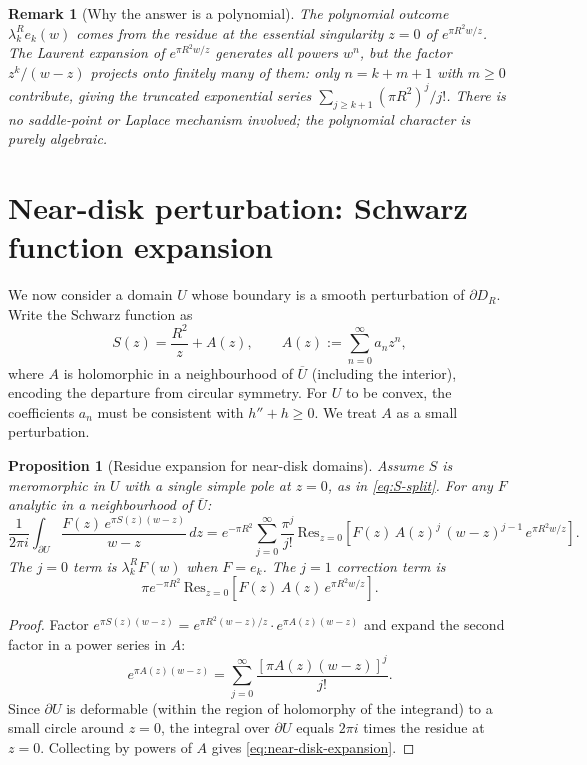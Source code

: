 \documentclass[a4paper,11pt,reqno]{amsart}
\newtheorem{proposition}{Proposition}[section]
\newtheorem{remark}{Remark}[section]
\begin{document}
\begin{remark}[Why the answer is a polynomial]
The polynomial outcome $\lambda_k^R e_k(w)$ comes from the residue at the
\emph{essential singularity} $z=0$ of $e^{\pi R^2 w/z}$. The Laurent expansion
of $e^{\pi R^2w/z}$ generates all powers $w^n$, but the factor $z^k/(w-z)$
projects onto finitely many of them: only $n=k+m+1$ with $m\ge0$ contribute,
giving the truncated exponential series $\sum_{j\ge k+1}(\pi R^2)^j/j!$. There
is no saddle-point or Laplace mechanism involved; the polynomial character is
purely algebraic.
\end{remark}

\section{Near-disk perturbation: Schwarz function expansion}
\label{sec:near-disk}

We now consider a domain $U$ whose boundary is a smooth perturbation of
$\partial D_R$. Write the Schwarz function as
\begin{equation}\label{eq:S-split}
S(z)=\frac{R^2}{z}+A(z),\qquad A(z):=\sum_{n=0}^\infty a_n z^n,
\end{equation}
where $A$ is holomorphic in a neighbourhood of $\overline{U}$ (including the
interior), encoding the departure from circular symmetry.
For $U$ to be convex, the coefficients $a_n$ must be consistent with
$h''+h\ge 0$. We treat $A$ as a small perturbation.

\begin{proposition}[Residue expansion for near-disk domains]
\label{prop:near-disk-residue}
Assume $S$ is meromorphic in $U$ with a single simple pole at $z=0$, as in
\eqref{eq:S-split}. For any $F$ analytic in a neighbourhood of $\overline{U}$:
\begin{equation}\label{eq:near-disk-expansion}
\frac{1}{2\pi i}\int_{\partial U}\frac{F(z)\,e^{\pi S(z)(w-z)}}{w-z}\,dz
=e^{-\pi R^2}\!\sum_{j=0}^\infty
\frac{\pi^j}{j!}\,\mathrm{Res}_{z=0}\!\left[F(z)\,A(z)^j\,(w-z)^{j-1}\,e^{\pi R^2 w/z}\right].
\end{equation}
The $j=0$ term is $\lambda_k^R F(w)$ when $F=e_k$.
The $j=1$ correction term is
\[
\pi e^{-\pi R^2}\,\mathrm{Res}_{z=0}\!\left[F(z)\,A(z)\,e^{\pi R^2 w/z}\right].
\]
\end{proposition}

\begin{proof}
Factor $e^{\pi S(z)(w-z)}=e^{\pi R^2(w-z)/z}\cdot e^{\pi A(z)(w-z)}$
and expand the second factor in a power series in $A$:
\[
e^{\pi A(z)(w-z)}=\sum_{j=0}^\infty\frac{[\pi A(z)(w-z)]^j}{j!}.
\]
Since $\partial U$ is deformable (within the region of holomorphy of the integrand)
to a small circle around $z=0$, the integral over $\partial U$ equals $2\pi i$
times the residue at $z=0$. Collecting by powers of $A$ gives
\eqref{eq:near-disk-expansion}.
\end{proof}
\end{document}
